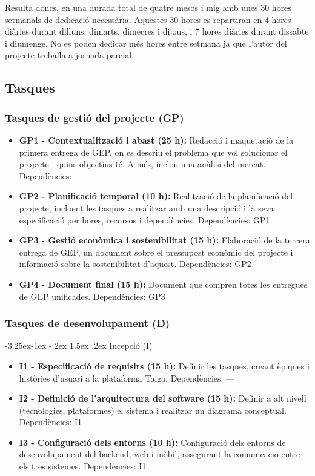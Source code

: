 \documentclass[11pt,a4paper]{report}
\makeatletter
\renewcommand\paragraph{\@startsection{paragraph}{4}{\z@}%
    {-3.25ex\@plus -1ex \@minus -.2ex}%
    {1.5ex \@plus .2ex}
    {\normalfont\normalsize\bfseries}}
\makeatother
\begin{document}
Resulta doncs, en una durada total de quatre mesos i mig amb unes 30 hores setmanals de dedicació necessària. Aquestes 30 hores es repartiran en 4 hores diàries durant dilluns, dimarts, dimecres i dijous, i 7 hores diàries durant dissabte i diumenge. No es poden dedicar més hores entre setmana ja que l'autor del projecte treballa a jornada parcial.
\subsection{Tasques}
\subsubsection{Tasques de gestió del projecte (GP)}
\begin{itemize}
    \item \textbf{GP1 - Contextualització i abast (25 h):} Redacció i maquetació de la primera entrega de GEP, on es descriu el problema que vol solucionar el projecte i quins objectius té. A més, inclou una anàlisi del mercat. Dependències: ---
    \item \textbf{GP2 - Planificació temporal (10 h):} Realització de la planificació del projecte, incloent les tasques a realitzar amb una descripció i la seva especificació per hores, recursos i dependències. Dependències: GP1
    \item \textbf{GP3 - Gestió econòmica i sostenibilitat (15 h):} Elaboració de la tercera entrega de GEP, un document sobre el pressupost econòmic del projecte i informació sobre la sostenibilitat d'aquest. Dependències: GP2
    \item \textbf{GP4 - Document final (15 h):} Document que compren totes les entregues de GEP unificades. Dependències: GP3
\end{itemize}

\subsubsection{Tasques de desenvolupament (D)}

\paragraph{Incepció (I)}
\begin{itemize}
    \item \textbf{I1 - Especificació de requisits (15 h):} Definir les tasques, creant èpiques i històries d'usuari a la plataforma Taiga. Dependències: ---
    \item \textbf{I2 - Definició de l'arquitectura del software (15 h):} Definir a alt nivell (tecnologies, plataformes) el sistema i realitzar un diagrama conceptual. Dependències: I1
    \item \textbf{I3 - Configuració dels entorns (10 h):} Configuració dels entorns de desenvolupament del backend, web i mòbil, assegurant la comunicació entre els tres sistemes. Dependències: I1
\end{itemize}
\end{document}
